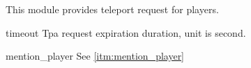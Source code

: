 
This module provides teleport request for players.



\begin{Configuration}
    \item[timeout]{
        Tpa request expiration duration, unit is second.
    }
    \item[mention\_player] {
        See \ref{itm:mention_player}
    }

\end{Configuration}

